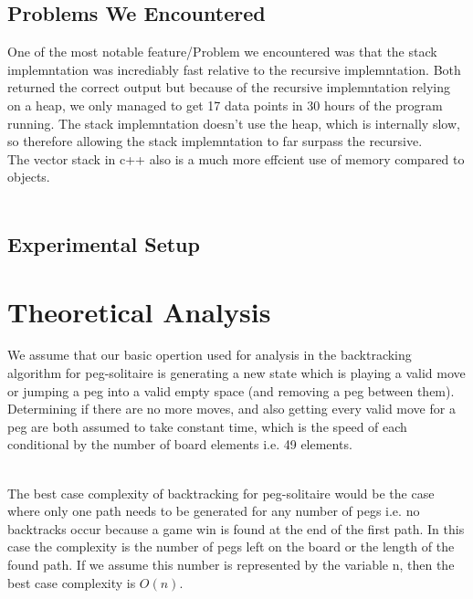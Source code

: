 \documentclass[a4paper]{article}
\begin{document}
\subsection{Problems We Encountered}
One of the most notable feature/Problem we encountered was that the stack implemntation was incrediably fast relative to the recursive implemntation. Both returned the correct output but because of the recursive implemntation relying on a heap, we only managed to get 17 data points in 30 hours of the program running. The stack implemntation doesn't use the heap, which is internally slow, so therefore allowing the stack implemntation to far surpass the recursive.\\
The vector stack in c++ also is a much more effcient use of memory compared to objects.\\\

\subsection{Experimental Setup}


\section{Theoretical Analysis}
We assume that our basic opertion used for analysis in the backtracking algorithm for peg-solitaire is generating a new state which is playing a valid move or jumping a peg into a valid empty space (and removing a peg between them). Determining if there are no more moves, and also getting every valid move for a peg are both assumed to take constant time, which is the speed of each conditional by the number of board elements i.e. 49 elements.\\\

\noindent The best case complexity of backtracking for peg-solitaire would be the case where only one path needs to be generated for any number of pegs i.e. no backtracks occur because a game win is found at the end of the first path. In this case the complexity is the number of pegs left on the board or the length of the found path. If we assume this number is represented by the variable n, then the best case complexity is $O(n)$.\\\
\end{document}
